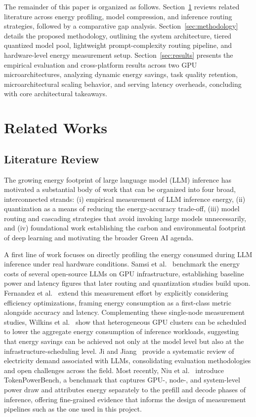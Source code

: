 \documentclass[runningheads]{llncs}
\begin{document}
The remainder of this paper is organized as follows. Section~\ref{sec:related-works} reviews related literature across energy profiling, model compression, and inference routing strategies, followed by a comparative gap analysis. Section~\ref{sec:methodology} details the proposed methodology, outlining the system architecture, tiered quantized model pool, lightweight prompt-complexity routing pipeline, and hardware-level energy measurement setup. Section~\ref{sec:results} presents the empirical evaluation and cross-platform results across two GPU microarchitectures, analyzing dynamic energy savings, task quality retention, microarchitectural scaling behavior, and serving latency overheads, concluding with core architectural takeaways.

\section{Related Works}
\label{sec:related-works}

\subsection{Literature Review}

The growing energy footprint of large language model (LLM) inference has motivated a substantial body of work that can be organized into four broad, interconnected strands: (i) empirical measurement of LLM inference energy, (ii) quantization as a means of reducing the energy-accuracy trade-off, (iii) model routing and cascading strategies that avoid invoking large models unnecessarily, and (iv) foundational work establishing the carbon and environmental footprint of deep learning and motivating the broader Green AI agenda.

A first line of work focuses on directly profiling the energy consumed during LLM inference under real hardware conditions. Samsi et al.~\cite{samsi2023words} benchmark the energy costs of several open-source LLMs on GPU infrastructure, establishing baseline power and latency figures that later routing and quantization studies build upon. Fernandez et al.~\cite{fernandez2025energy} extend this measurement effort by explicitly considering efficiency optimizations, framing energy consumption as a first-class metric alongside accuracy and latency. Complementing these single-node measurement studies, Wilkins et al.~\cite{wilkins2024hybrid} show that heterogeneous GPU clusters can be scheduled to lower the aggregate energy consumption of inference workloads, suggesting that energy savings can be achieved not only at the model level but also at the infrastructure-scheduling level. Ji and Jiang~\cite{ji2025systematic} provide a systematic review of electricity demand associated with LLMs, consolidating evaluation methodologies and open challenges across the field. Most recently, Niu et al.~\cite{niu2026tokenpowerbench} introduce TokenPowerBench, a benchmark that captures GPU-, node-, and system-level power draw and attributes energy separately to the prefill and decode phases of inference, offering fine-grained evidence that informs the design of measurement pipelines such as the one used in this project.
\end{document}
